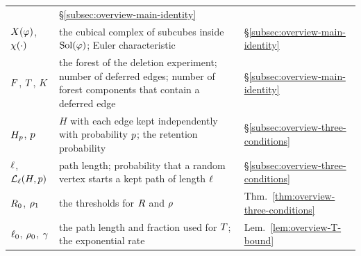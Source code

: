 \begin{center}
\begin{tabular}{@{}p{}p{}p{}@{}}
  & \S\ref{subsec:overview-main-identity}\\
\(X(\varphi)\), \(\chi(\cdot)\)
  & the cubical complex of subcubes inside \(\operatorname{Sol}(\varphi)\); Euler characteristic
  & \S\ref{subsec:overview-main-identity}\\
\(F\), \(T\), \(K\)
  & the forest of the deletion experiment; number of deferred edges; number of
    forest components that contain a deferred edge
  & \S\ref{subsec:overview-main-identity}\\
\(H_{p}\), \(p\)
  & \(H\) with each edge kept independently with probability \(p\);
    the retention probability
  & \S\ref{subsec:overview-three-conditions}\\
\(\ell\), \(\mathcal{L}_{\ell}(H,p)\)
  & path length; probability that a random vertex starts a kept path of
    length \(\ell\)
  & \S\ref{subsec:overview-three-conditions}\\
\(R_0\), \(\rho_1\)
  & the thresholds for \(R\) and \(\rho\)
  & Thm.~\ref{thm:overview-three-conditions}\\
\(\ell_0\), \(\rho_0\), \(\gamma\)
  & the path length and fraction used for \(T\); the exponential rate
  & Lem.~\ref{lem:overview-T-bound}\\
\hline
\end{tabular}
\end{center}

